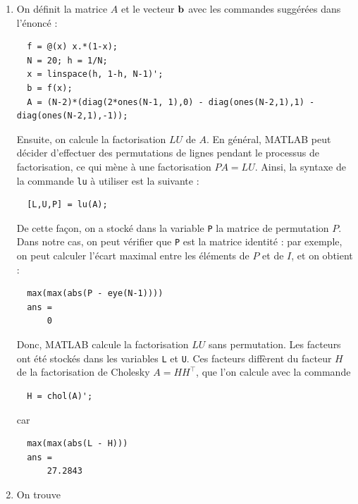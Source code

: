 \begin{enumerate}[label=\alph*)]
  \item On définit la matrice $A$ et le vecteur $\mathbf{b}$ avec les commandes suggérées dans l'énoncé :
  
\begin{verbatim}
  f = @(x) x.*(1-x);
  N = 20; h = 1/N;
  x = linspace(h, 1-h, N-1)'; 
  b = f(x);
  A = (N-2)*(diag(2*ones(N-1, 1),0) - diag(ones(N-2,1),1) - diag(ones(N-2,1),-1));
\end{verbatim}
        
        Ensuite, on calcule la factorisation $LU$ de $A$.
        En général, \textsc{MATLAB} peut décider d'effectuer des permutations de lignes pendant le processus de factorisation, ce qui mène à une factorisation $PA = LU$.
        Ainsi, la syntaxe de la commande \texttt{lu} à utiliser est la suivante :
        
\begin{verbatim}
  [L,U,P] = lu(A);
\end{verbatim}
        
        De cette façon, on a stocké dans la variable \texttt{P} la matrice de permutation $P$.
        Dans notre cas, on peut vérifier que \texttt{P} est la matrice identité : par exemple, on peut calculer l'écart maximal entre les éléments de $P$ et de $I$, et on obtient :
  
\begin{verbatim}
  max(max(abs(P - eye(N-1))))
  ans =
      0
\end{verbatim}
        
        Donc, \textsc{MATLAB} calcule la factorisation $LU$ sans permutation.
        Les facteurs ont été stockés dans les variables \texttt{L} et \texttt{U}.
        Ces facteurs diffèrent du facteur $H$ de la factorisation de Cholesky $A = H H^{\top}$, que l'on calcule avec la commande
  
\begin{verbatim}
  H = chol(A)';
\end{verbatim}
        
        car
        
\begin{verbatim}
  max(max(abs(L - H)))
  ans =
      27.2843
\end{verbatim}
        
  \item On trouve
  
        
        
        

\end{enumerate}
